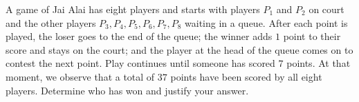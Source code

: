 A game of Jai Alai has eight players and starts with players $P_1$ and $P_2$ on court and the other players $P_3,P_4,P_5,P_6,P_7,P_8$ waiting in a queue. After each point is played, the loser goes to the end of the queue; the winner adds $1$ point to their score and stays on the court; and the player at the head of the queue comes on to contest the next point. Play continues until someone has scored $7$ points. At that moment, we observe that a total of $37$ points have been scored by all eight players. Determine who has won and justify your answer.
